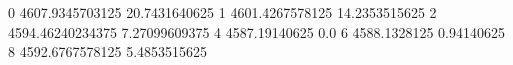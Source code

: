 0 4607.9345703125 20.7431640625
1 4601.4267578125 14.2353515625
2 4594.46240234375 7.27099609375
4 4587.19140625 0.0
6 4588.1328125 0.94140625
8 4592.6767578125 5.4853515625
